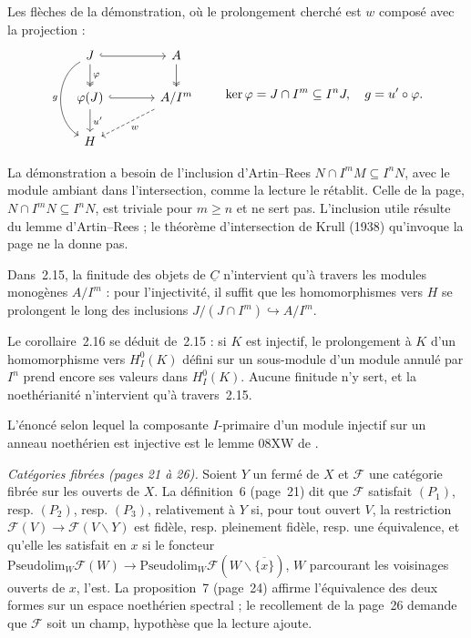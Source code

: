 Les flèches de la démonstration, où le prolongement cherché est $w$ composé avec la projection :
\[
\begin{tikzcd}[column sep=large]
J \arrow[r, hook] \arrow[d, two heads, "\varphi"] \arrow[dd, bend right=60, "g"'] & A \arrow[d, two heads] \\
\varphi(J) \arrow[r, hook] \arrow[d, "u'"] & A/I^m \arrow[dl, dashed, "w"] \\
H &
\end{tikzcd}
\qquad \ker\varphi = J \cap I^m \subseteq I^n J, \quad g = u' \circ \varphi.
\]



\begin{remarque}
La démonstration a besoin de l'inclusion d'Artin--Rees $N \cap I^m M \subseteq I^n N$, avec le module ambiant dans l'intersection, comme la lecture le rétablit. Celle de la page, $N \cap I^m N \subseteq I^n N$, est triviale pour $m \geqslant n$ et ne sert pas. L'inclusion utile résulte du lemme d'Artin--Rees ; le théorème d'intersection de Krull (1938) qu'invoque la page ne la donne pas.
\end{remarque}

\begin{remarque}
Dans~2.15, la finitude des objets de $\underline{C}$ n'intervient qu'à travers les modules monogènes $A/I^m$ : pour l'injectivité, il suffit que les homomorphismes vers $H$ se prolongent le long des inclusions $J/(J \cap I^m) \hookrightarrow A/I^m$.
\end{remarque}

\begin{remarque}
Le corollaire~2.16 se déduit de~2.15 : si $K$ est injectif, le prolongement à $K$ d'un homomorphisme vers $H^0_I(K)$ défini sur un sous-module d'un module annulé par $I^n$ prend encore ses valeurs dans $H^0_I(K)$. Aucune finitude n'y sert, et la noethérianité n'intervient qu'à travers~2.15.
\end{remarque}

\begin{remarque}
L'énoncé selon lequel la composante $I$-primaire d'un module injectif sur un anneau noethérien est injective est le lemme 08XW de \cite{stacks}.
\end{remarque}

\noindent\emph{Catégories fibrées (pages 21 à 26).} Soient $Y$ un fermé de $X$ et $\mathcal F$ une catégorie fibrée sur les ouverts de $X$. La définition~6 (page~21) dit que $\mathcal F$ satisfait $(P_1)$, resp. $(P_2)$, resp. $(P_3)$, relativement à $Y$ si, pour tout ouvert $V$, la restriction $\mathcal F(V) \to \mathcal F(V \smallsetminus Y)$ est fidèle, resp. pleinement fidèle, resp. une équivalence, et qu'elle les satisfait en $x$ si le foncteur $\mathrm{Pseudolim}_W \mathcal F(W) \to \mathrm{Pseudolim}_W \mathcal F(W \smallsetminus \overline{\{x\}})$, $W$ parcourant les voisinages ouverts de $x$, l'est. La proposition~7 (page~24) affirme l'équivalence des deux formes sur un espace noethérien spectral ; le recollement de la page~26 demande que $\mathcal F$ soit un champ, hypothèse que la lecture ajoute.

